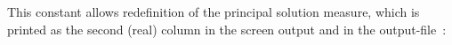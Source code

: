 
 This constant allows redefinition of the principal solution measure, which is
 printed as the second (real) column in the screen output and in the 
 output-file~:
 
